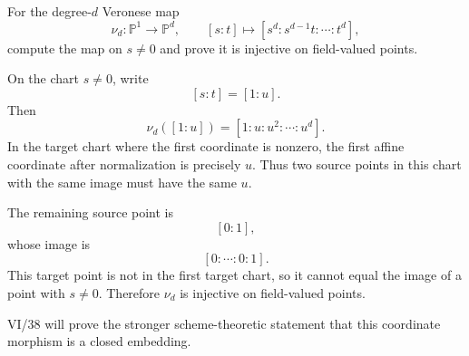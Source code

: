 \begin{problem}\label{prob:vi36-19}
For the degree-\(d\) Veronese map
\[
\nu_d:\mathbb P^1\to\mathbb P^d,
\qquad
[s:t]\mapsto[s^d:s^{d-1}t:\cdots:t^d],
\]
compute the map on \(s\neq0\) and prove it is injective on field-valued points.

\end{problem}

\ifdefined\FullProblemDossiers
\begin{solution}
On the chart \(s\neq0\), write
\[
[s:t]=[1:u].
\]
Then
\[
\boxed{
\nu_d([1:u])
=
[1:u:u^2:\cdots:u^d].
}
\]
In the target chart where the first coordinate is nonzero, the first affine coordinate after normalization is
precisely \(u\). Thus two source points in this chart with the same image must have the same \(u\).

The remaining source point is
\[
[0:1],
\]
whose image is
\[
[0:\cdots:0:1].
\]
This target point is not in the first target chart, so it cannot equal the image of a point with \(s\neq0\).
Therefore \(\nu_d\) is injective on field-valued points.

VI/38 will prove the stronger scheme-theoretic statement that this coordinate morphism is a closed embedding.
\end{solution}
\fi
